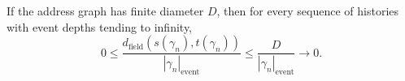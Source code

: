 \setcounter{theorem}{0}
\begin{proposition}
If the address graph has finite diameter $D$, then for every sequence of histories with event depths tending to infinity,
\[
0\leq\frac{d_{\mathrm{field}}(s(\gamma_n),t(\gamma_n))}{|\gamma_n|_{\mathrm{event}}}
\leq\frac{D}{|\gamma_n|_{\mathrm{event}}}\longrightarrow0.
\]
\end{proposition}
